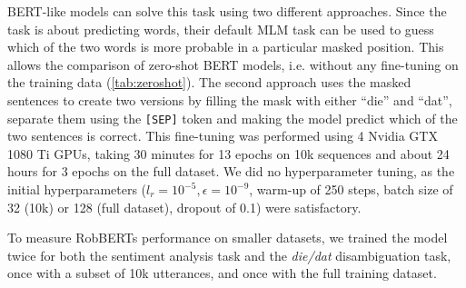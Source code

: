 \documentclass[11pt,a4paper]{article}
\begin{document}
BERT-like models can solve this task using two different approaches.
Since the task is about predicting words, their default MLM task can be used to guess which of the two words is more probable in a particular masked position.
This allows the comparison of zero-shot BERT models, i.e. without any fine-tuning on the training data (\autoref{tab:zeroshot}).
The second approach uses the masked sentences to create two versions by filling the mask with either ``die'' and ``dat'', separate them using the \texttt{[SEP]} token and making the model predict which of the two sentences is correct.
This fine-tuning was performed using 4 Nvidia GTX 1080 Ti GPUs, taking 30 minutes for 13 epochs on 10k sequences and about 24 hours for 3 epochs on the full dataset.
We did no hyperparameter tuning, as the initial hyperparameters ($l_r=10^{-5}, \epsilon=10^{-9}$, warm-up of 250 steps, batch size of 32 (10k) or 128 (full dataset), dropout of 0.1) were satisfactory. 

To measure RobBERTs performance on smaller datasets, we trained the model twice for both the sentiment analysis task and the \emph{die/dat} disambiguation task, once with a subset of 10k utterances, and once with the full training dataset.

\begin{table}[htb]
\centering
\caption{Performance of predicting \textit{die/dat} as most likely candidate for a mask using zero-shot BERT models (i.e. without fine-tuning)  as well as a majority class predictor (ZeroR), tested on the 288,799 test set sentences}
\label{tab:zeroshot}
\end{table}
\end{document}
